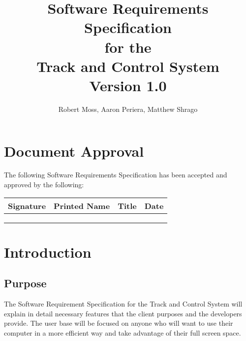 \documentclass[titlepage]{article}
\begin{document}
\title{
\textbf{
Software Requirements Specification}
\protect\\
for the
\protect\\
\textbf{
Track and Control System}
\protect\\
{\small Version 1.0}}

\author{Robert Moss, Aaron Periera, Matthew Shrago}
\maketitle

\section*{Document Approval}

The following Software Requirements Specification has been accepted and approved by the following:

\begin{center}
    \begin{tabularx}{\textwidth}{ |X|X|X|X| }
    \hline
    \textbf{Signature} & \textbf{Printed Name} & \textbf{Title} & \textbf{Date} \\ \hline
     &  &  &  \\ \hline
     &  &  &  \\ \hline
     &  &  &  \\ \hline
    \end{tabularx}
\end{center}

\newpage
\tableofcontents{} 
\newpage

\section{Introduction}


\subsection{Purpose}
The Software Requirement Specification for the Track and Control System will explain in detail necessary features that the client purposes and the developers provide. The user base will be focused on anyone who will want to use their computer in a more efficient way and take advantage of their full screen space. 
\end{document}
